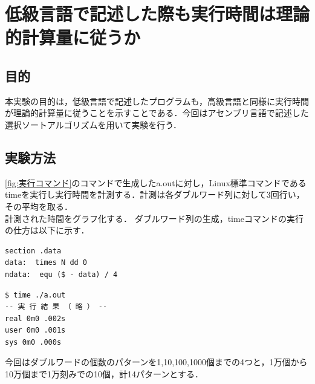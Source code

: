\chapter{低級言語で記述した際も実行時間は理論的計算量に従うか}
\section{目的}
本実験の目的は，低級言語で記述したプログラムも，高級言語と同様に実行時間が理論的計算量に従うことを示すことである．今回はアセンブリ言語で記述した選択ソートアルゴリズムを用いて実験を行う．
\section{実験方法}
\ref{fig:実行コマンド}のコマンドで生成したa.outに対し，Linux標準コマンドであるtimeを実行し実行時間を計測する．計測は各ダブルワード列に対して3回行い，その平均を取る．\\
計測された時間をグラフ化する．
ダブルワード列の生成，timeコマンドの実行の仕方は以下に示す．
\begin{lstlisting}[numbers={none}, caption={ダブルワード列の生成（N=データ数)}]
    section .data
data:  times N dd 0
ndata:  equ ($ - data) / 4
\end{lstlisting}
\begin{lstlisting}[numbers={none}, caption={timeの実行(realが実行時間)},label={fig:アセンブリ計測}]
$ time ./a.out
-- 実 行 結 果 （ 略 ） --
real 0m0 .002s
user 0m0 .001s
sys 0m0 .000s
\end{lstlisting}
今回はダブルワードの個数のパターンを1,10,100,1000個までの4つと，1万個から10万個まで1万刻みでの10個，計14パターンとする．

\clearpage

